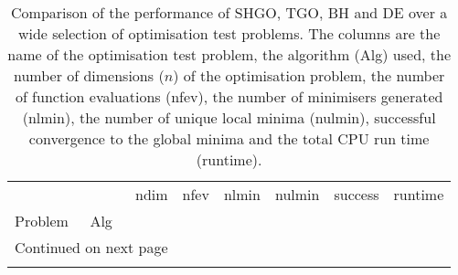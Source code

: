 \begin{longtable}{llrrrrlr}
\caption{Comparison of the performance of SHGO, TGO, BH and DE over a wide selection of optimisation test problems. The columns are the name of the optimisation test problem, the algorithm (Alg) used, the number of dimensions ($n$) of the optimisation problem, the number of function evaluations (nfev), the number of minimisers generated (nlmin), the number of unique local minima (nulmin), successful convergence to the global minima and the total CPU run time (runtime). \label{tab:results}}\\    %
\toprule
         &    &  ndim &     nfev &  nlmin &  nulmin & success &     runtime \\
Problem & Alg &       &          &        &         &         &             \\
\midrule
\endhead
\midrule
\multicolumn{3}{r}{{Continued on next page}} \\
\midrule
\endfoot


\end{longtable}
